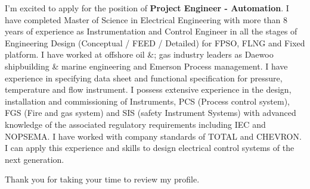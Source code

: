 \documentclass[11pt, a4paper]{ishan-cl} %
\newcommand{\positionname}{\textbf{Project Engineer - Automation}}%
\begin{document}
	
	\makecvheader %
	\makelettertitle %
	
	
	\begin{cvletter}
		
		I’m excited to apply for the position of \textbf{\positionname}. %
		I have completed Master of Science in Electrical Engineering with more than 8
		years of experience as Instrumentation and Control Engineer in all the stages of Engineering
		Design (Conceptual / FEED / Detailed) for FPSO, FLNG and Fixed platform. I have worked at
		offshore oil \&; gas industry leaders as Daewoo shipbuilding \& marine engineering and
		Emerson Process management. I have experience in specifying data sheet and functional specification for pressure, temperature and flow instrument. I possess extensive experience in the design, installation and
		commissioning of Instruments, PCS (Process control system), FGS (Fire and gas system) and
		SIS (safety Instrument Systems) with advanced knowledge of the associated regulatory
		requirements including IEC and NOPSEMA. I have worked with company standards of TOTAL
		and CHEVRON. I can apply this experience and skills to design electrical control systems of the
		next generation. 
		
		
		Thank you for taking your time to review my profile.
		\\
	\end{cvletter}
	
	\makeletterclosing %
\end{document}
